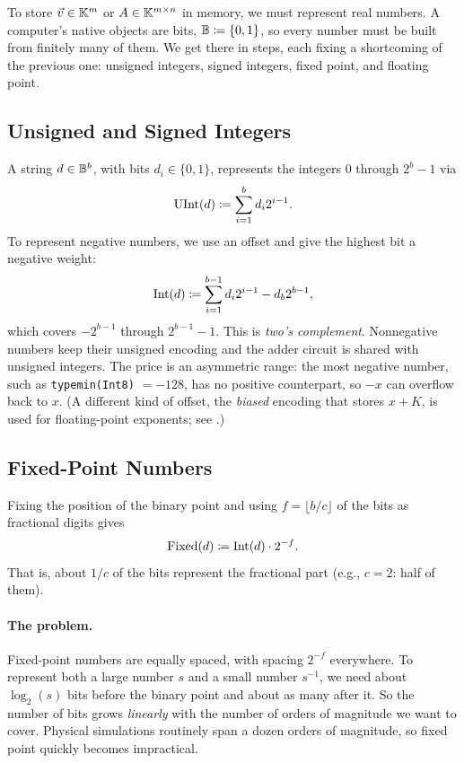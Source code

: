 To store $\vec{v} \in \mathbb{K}^m$ or $A \in \mathbb{K}^{m \times n}$ in memory, we must represent real numbers. A computer's native objects are bits, $\mathbb{B} \coloneqq \{0, 1\}$, so every number must be built from finitely many of them. We get there in steps, each fixing a shortcoming of the previous one: unsigned integers, signed integers, fixed point, and floating point.

\subsection{Unsigned and Signed Integers}

A string $d \in \mathbb{B}^b$, with bits $d_i \in \{0, 1\}$, represents the integers $0$ through $2^b - 1$ via
\begin{equation}
  \operatorname{UInt}(d) \coloneqq \sum_{i=1}^{b} d_i 2^{i-1}.
\end{equation}
To represent negative numbers, we use an offset and give the highest bit a negative weight:
\begin{equation}
  \operatorname{Int}(d) \coloneqq \sum_{i=1}^{b-1} d_i 2^{i-1} - d_b 2^{b-1},
\end{equation}
which covers $-2^{b-1}$ through $2^{b-1} - 1$. This is \emph{two's complement}. Nonnegative numbers keep their unsigned encoding and the adder circuit is shared with unsigned integers. The price is an asymmetric range: the most negative number, such as \texttt{typemin(Int8)} $= -128$, has no positive counterpart, so $-x$ can overflow back to $x$. (A different kind of offset, the \emph{biased} encoding that stores $x + K$, is used for floating-point exponents; see .)

\subsection{Fixed-Point Numbers}

Fixing the position of the binary point and using $f = \lfloor b/c \rfloor$ of the bits as fractional digits gives
\begin{equation}
  \operatorname{Fixed}(d) \coloneqq \operatorname{Int}(d) \cdot 2^{-f}.
\end{equation}
That is, about $1/c$ of the bits represent the fractional part (e.g., $c = 2$: half of them).

\paragraph{The problem.} Fixed-point numbers are equally spaced, with spacing $2^{-f}$ everywhere. To represent both a large number $s$ and a small number $s^{-1}$, we need about $\log_2(s)$ bits before the binary point and about as many after it. So the number of bits grows \emph{linearly} with the number of orders of magnitude we want to cover. Physical simulations routinely span a dozen orders of magnitude, so fixed point quickly becomes impractical.

